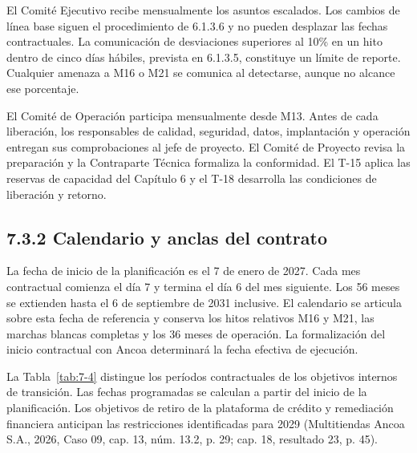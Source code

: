 \documentclass[11pt]{article}
\begin{document}
El Comité Ejecutivo recibe mensualmente los asuntos escalados. Los cambios de línea base siguen el procedimiento de 6.1.3.6 y no pueden desplazar las fechas contractuales. La comunicación de desviaciones superiores al 10\% en un hito dentro de cinco días hábiles, prevista en 6.1.3.5, constituye un límite de reporte. Cualquier amenaza a M16 o M21 se comunica al detectarse, aunque no alcance ese porcentaje.

El Comité de Operación participa mensualmente desde M13. Antes de cada liberación, los responsables de calidad, seguridad, datos, implantación y operación entregan sus comprobaciones al jefe de proyecto. El Comité de Proyecto revisa la preparación y la Contraparte Técnica formaliza la conformidad. El T-15 aplica las reservas de capacidad del Capítulo 6 y el T-18 desarrolla las condiciones de liberación y retorno.

\subsection{7.3.2 Calendario y anclas del contrato}

La fecha de inicio de la planificación es el 7 de enero de 2027. Cada mes contractual comienza el día 7 y termina el día 6 del mes siguiente. Los 56 meses se extienden hasta el 6 de septiembre de 2031 inclusive. El calendario se articula sobre esta fecha de referencia y conserva los hitos relativos M16 y M21, las marchas blancas completas y los 36 meses de operación. La formalización del inicio contractual con Ancoa determinará la fecha efectiva de ejecución.

La Tabla~\ref{tab:7-4} distingue los períodos contractuales de los objetivos internos de transición. Las fechas programadas se calculan a partir del inicio de la planificación. Los objetivos de retiro de la plataforma de crédito y remediación financiera anticipan las restricciones identificadas para 2029 (Multitiendas Ancoa S.A., 2026, Caso 09, cap. 13, núm. 13.2, p. 29; cap. 18, resultado 23, p. 45).
\end{document}
